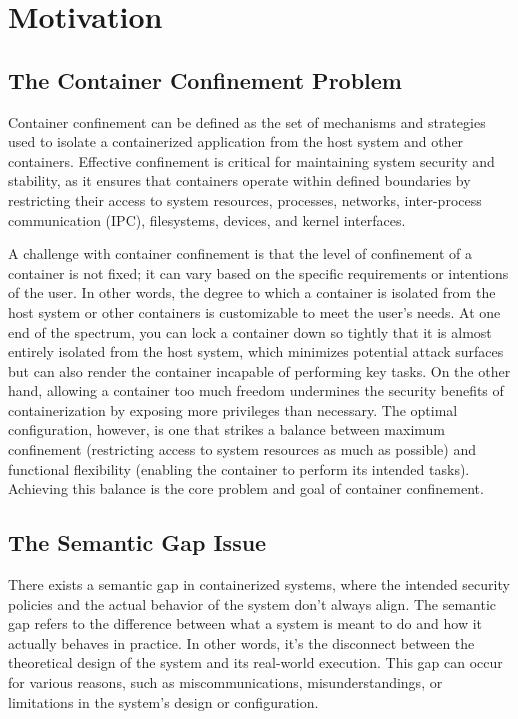 \section{Motivation}
\label{sec:confinement}

\subsection{The Container Confinement Problem}

Container confinement can be defined as the set of mechanisms and strategies used to isolate a containerized application from the host system and other containers. Effective confinement is critical for maintaining system security and stability, as it ensures that containers operate within defined boundaries by restricting their access to system resources, processes, networks, inter-process communication (IPC), filesystems, devices, and kernel interfaces. 

A challenge with container confinement is that the level of confinement of a container is not fixed; it can vary based on the specific requirements or intentions of the user. In other words, the degree to which a container is isolated from the host system or other containers is customizable to meet the user’s needs. At one end of the spectrum, you can lock a container down so tightly that it is almost entirely isolated from the host system, which minimizes potential attack surfaces but can also render the container incapable of performing key tasks. On the other hand, allowing a container too much freedom undermines the security benefits of containerization by exposing more privileges than necessary. The optimal configuration, however, is one that strikes a balance between maximum confinement (restricting access to system resources as much as possible) and functional flexibility (enabling the container to perform its intended tasks). Achieving this balance is the core problem and goal of container confinement.

\subsection{The Semantic Gap Issue}

There exists a semantic gap in containerized systems, where the intended security policies and the actual behavior of the system don't always align. The semantic gap refers to the difference between what a system is meant to do and how it actually behaves in practice. In other words, it’s the disconnect between the theoretical design of the system and its real-world execution. This gap can occur for various reasons, such as miscommunications, misunderstandings, or limitations in the system's design or configuration.

